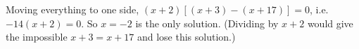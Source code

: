 Moving everything to one side, $(x+2)\left[(x+3)-(x+17)\right]=0$, i.e. $-14(x+2)=0$. So $x=\boxed{-2}$ is the only solution. (Dividing by $x+2$ would give the impossible $x+3=x+17$ and lose this solution.)

